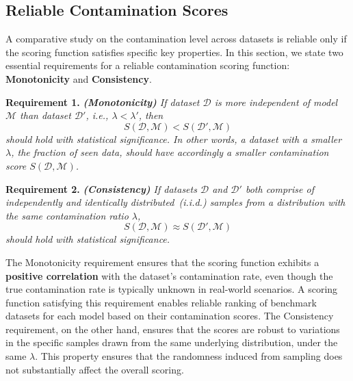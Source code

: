 \subsection{Reliable Contamination Scores}
\label{sec:rcsr}
A comparative study on the contamination level across datasets is reliable only if the scoring function satisfies specific key properties.
In this section, we state two essential requirements for a reliable contamination scoring function: \textbf{Monotonicity} and \textbf{Consistency}.

\noindent\textbf{Requirement 1.} \textit{\textbf{(Monotonicity)} If dataset $\mathcal{D}$ is more independent of model $\mathcal{M}$ than dataset $\mathcal{D}'$, i.e., $\lambda < \lambda'$, then}
\begin{equation*}
    S(\mathcal{D}, \mathcal{M}) < S(\mathcal{D}', \mathcal{M})
\end{equation*}
\textit{should hold with statistical significance.  In other words, a dataset with a smaller $\lambda$, the fraction of seen data, should have accordingly a smaller contamination score $S(\mathcal{D}, \mathcal{M})$.}

\noindent\textbf{Requirement 2.} \textit{\textbf{(Consistency)} If datasets $\mathcal{D}$ and $\mathcal{D}'$ both comprise of independently and identically distributed~(i.i.d.) samples from a distribution with the same contamination ratio $\lambda$,}
\begin{equation*}
    S(\mathcal{D},\mathcal{M}) \approx S(\mathcal{D}', \mathcal{M})
\end{equation*}
\textit{should hold with statistical significance.}


The Monotonicity requirement ensures that the scoring function exhibits a \textbf{positive correlation} with the dataset's contamination rate, even though the true contamination rate is typically unknown in real-world scenarios.
A scoring function satisfying this requirement enables reliable ranking of benchmark datasets for each model based on their contamination scores.
The Consistency requirement, on the other hand, ensures that the scores are robust to variations in the specific samples drawn from the same underlying distribution, under the same $\lambda$.
This property ensures that the randomness induced from sampling does not substantially affect the overall scoring.